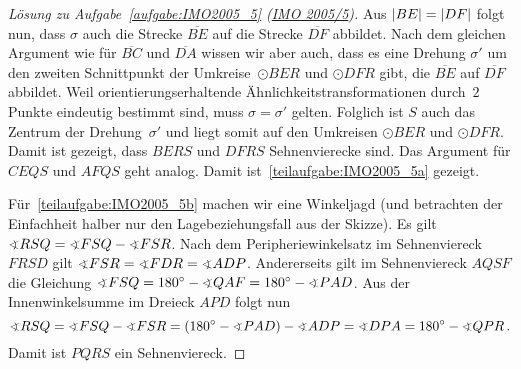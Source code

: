 \begin{proof}[Lösung zu Aufgabe~\ref{aufgabe:IMO2005_5} \textmd{(\href{https://artofproblemsolving.com/community/c3832_2005_imo}{IMO 2005/5})}]
	Aus $\abs*{BE}=\abs*{DF}$ folgt nun, dass $\sigma$ auch die Strecke $\overline{BE}$ auf die Strecke $\overline{DF}$ abbildet. Nach dem gleichen Argument wie für $\overline{BC}$ und $\overline{DA}$ wissen wir aber auch, dass es eine Drehung $\sigma'$ um den zweiten Schnittpunkt der Umkreise~$\odot BER$ und $\odot DFR$ gibt, die $\overline{BE}$ auf $\overline{DF}$ abbildet. Weil orientierungserhaltende Ähnlichkeitstransformationen durch~$2$ Punkte eindeutig bestimmt sind, muss $\sigma=\sigma'$ gelten. Folglich ist $S$ auch das Zentrum der Drehung~$\sigma'$ und liegt somit auf den Umkreisen $\odot BER$ und $\odot DFR$. Damit ist gezeigt, dass $BERS$ und $DFRS$ Sehnenvierecke sind. Das Argument für $CEQS$ und $AFQS$ geht analog. Damit ist~\ref{teilaufgabe:IMO2005_5a} gezeigt.
	
	Für~\ref{teilaufgabe:IMO2005_5b} machen wir eine Winkeljagd (und betrachten der Einfachheit halber nur den Lagebeziehungsfall aus der Skizze). Es gilt $\winkel RSQ=\winkel FSQ-\winkel FSR$. Nach dem Peripheriewinkelsatz im Sehnenviereck $FRSD$ gilt $\winkel FSR=\winkel FDR=\winkel ADP$. Andererseits gilt im Sehnenviereck $AQSF$ die Gleichung $\winkel FSQ=180^\circ-\winkel QAF=180^\circ-\winkel PAD$. Aus der Innenwinkelsumme im Dreieck $APD$ folgt nun
	\begin{equation*}
		\winkel RSQ=\winkel FSQ-\winkel FSR=\parens*{180^\circ-\winkel PAD}-\winkel ADP=\winkel DPA=180^\circ-\winkel QPR\,.
	\end{equation*}
	Damit ist $PQRS$ ein Sehnenviereck.
\end{proof}
